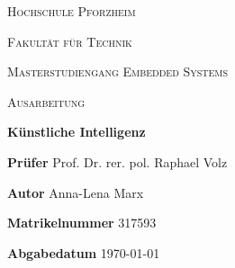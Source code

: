 \documentclass[a4paper, oneside, 12pt]{article}
\begin{document}

\begin{titlepage}
{
\centering
\textsc{\LARGE Hochschule Pforzheim} \par 
\vspace{0.3cm}
\textsc{\LARGE Fakultät für Technik} \par 
\vspace{1.0cm}
\textsc{\Large Masterstudiengang Embedded Systems} \par 
\vspace{5.0cm}
\textsc{\Large Ausarbeitung} \par 
\vspace{1.0cm}
\huge\textbf{Künstliche Intelligenz} \par 
\vspace{6.3cm}
\Large 
}

\textbf{Prüfer} \hfill Prof. Dr. rer. pol. Raphael Volz \par %
\textbf{Autor} \hfill Anna-Lena Marx \par 
\textbf{Matrikelnummer} \hfill 317593 \par
\vspace{2.0cm}
\textbf{Abgabedatum} \hfill \today


\end{titlepage}

%


\newpage




\pagestyle {headings}
%
%


\tableofcontents
\newpage



%





\newpage \appendix



\printbibliography

\listoflistings
\listoffigures
\listoftables
\end{document}
